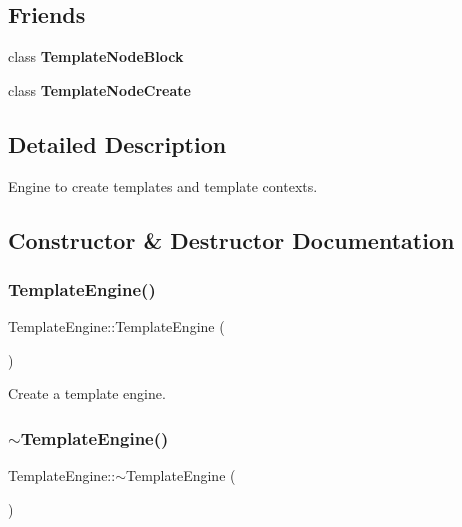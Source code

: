 \subsection*{Friends}
\begin{DoxyCompactItemize}
\item 
\mbox{\label{class_template_engine_a593d2451d446162c730018cba7cf8687}} 
class {\bfseries Template\+Node\+Block}
\item 
\mbox{\label{class_template_engine_a5c3e9f3b7b4bfba827a974c325715b36}} 
class {\bfseries Template\+Node\+Create}
\end{DoxyCompactItemize}


\subsection{Detailed Description}
Engine to create templates and template contexts. 

\subsection{Constructor \& Destructor Documentation}
\mbox{\label{class_template_engine_ad12f5d696ed3fc82fd729e1b6892d328}} 
\subsubsection{\texorpdfstring{TemplateEngine()}{TemplateEngine()}}
{\footnotesize\ttfamily Template\+Engine\+::\+Template\+Engine (\begin{DoxyParamCaption}{ }\end{DoxyParamCaption})}

Create a template engine. \mbox{\label{class_template_engine_a8648e1b96a8c4bff1fe1b2c38a84948b}} 
\subsubsection{\texorpdfstring{$\sim$TemplateEngine()}{~TemplateEngine()}}
{\footnotesize\ttfamily Template\+Engine\+::$\sim$\+Template\+Engine (\begin{DoxyParamCaption}{ }\end{DoxyParamCaption})}

